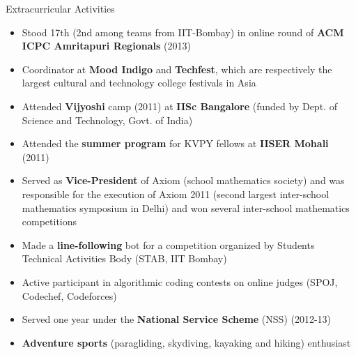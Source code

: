 \documentclass{resume2} %
\begin{document}
\begin{rSection}{Extracurricular Activities}
\begin{itemize}[leftmargin=*]
\item Stood 17th (2nd among teams from IIT-Bombay) in online round of \textbf{ACM ICPC Amritapuri Regionals} (2013)
\item Coordinator at \textbf{Mood Indigo} and \textbf{Techfest}, which are respectively the largest cultural and technology college festivals in Asia 
\item Attended \textbf{Vijyoshi} camp (2011) at \textbf{IISc Bangalore} (funded by Dept. of Science and Technology, Govt. of India)
\item Attended the \textbf{summer program} for KVPY fellows at \textbf{IISER Mohali} (2011)
\item Served as \textbf{Vice-President} of Axiom (school mathematics society) and was responsible for the execution of Axiom 2011 (second largest inter-school mathematics symposium in Delhi) and won several inter-school mathematics competitions
\item Made a \textbf{line-following} bot for a competition organized by Students Technical Activities Body (STAB, IIT Bombay)
\item Active participant in algorithmic coding contests on online judges (SPOJ, Codechef, Codeforces)
\item Served one year under the \textbf{National Service Scheme} (NSS) (2012-13)
\item \textbf{Adventure sports} (paragliding, skydiving, kayaking and hiking) enthusiast
\end{itemize}
\end{rSection}
\end{document}
